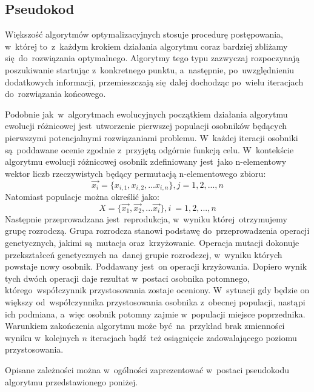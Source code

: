 \subsection{Pseudokod}
\par
Większość algorytmów optymalizacyjnych stosuje procedurę postępowania, w~której to~z~każdym krokiem działania algorytmu coraz bardziej zbliżamy się~do~rozwiązania optymalnego. Algorytmy tego typu zazwyczaj rozpoczynają poszukiwanie startując z~konkretnego punktu, a~następnie, po~uwzględnieniu dodatkowych informacji, przemieszczają się~dalej dochodząc po~wielu iteracjach do~rozwiązania końcowego.\\
\par
Podobnie jak~w~algorytmach ewolucyjnych początkiem działania algorytmu ewolucji różnicowej jest~utworzenie pierwszej populacji osobników będących pierwszymi potencjalnymi rozwiązaniami problemu. W~każdej iteracji osobniki są~poddawane ocenie zgodnie z~przyjętą odgórnie funkcją celu. W~kontekście algorytmu ewolucji różnicowej osobnik zdefiniowany jest~jako n-elementowy wektor liczb rzeczywistych będący permutacją n-elementowego zbioru:\\
\begin{equation}
 \overrightarrow{x_{i}}=\{x_{i,1},x_{i,2},...x_{i,n}\}, j = 1,2,...,n
\end{equation}
Natomiast populacje można określić jako:\\
\begin{equation}
X=\{\overrightarrow{x_{1}},\overrightarrow{x_{2}},...\overrightarrow{x_{i}}\}, i~= 1,2,...,n
\end{equation}
Następnie przeprowadzana jest~reprodukcja, w~wyniku której~otrzymujemy grupę rozrodczą. Grupa rozrodcza stanowi podstawę do~przeprowadzenia operacji genetycznych, jakimi są~mutacja oraz~krzyżowanie. Operacja mutacji dokonuje przekształceń genetycznych na~danej grupie rozrodczej, w~wyniku których powstaje nowy osobnik. Poddawany jest~on operacji krzyżowania. Dopiero wynik tych dwóch operacji daje rezultat w~postaci osobnika potomnego, którego~współczynnik przystosowania zostaje oceniony. W~sytuacji gdy będzie on większy od~współczynnika przystosowania osobnika z~obecnej populacji, nastąpi ich podmiana, a~więc osobnik potomny zajmie w~populacji miejsce poprzednika. Warunkiem zakończenia algorytmu może być~na~przykład brak zmienności wyniku w~kolejnych $n$ iteracjach bądź~też osiągnięcie zadowalającego poziomu przystosowania.\\
\par
Opisane zależności można w~ogólności zaprezentować w~postaci pseudokodu algorytmu przedstawionego poniżej.

